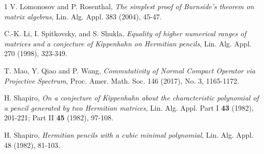 \documentclass[draft, 12pt, reqno]{amsart}
\numberwithin{equation}{section}
\theoremstyle{plain}
\begin{document}
\begin{thebibliography}{1}
 V. Lomonosov and P. Rosenthal, {\em The simplest proof of Burnside’s theorem on matrix algebras}, Lin. Alg. Appl. 383 (2004), 45-47.

 C.-K. Li, I. Spitkovsky, and S. Shukla, {\em Equality of higher numerical ranges of matrices and a conjecture of Kippenhahn on Hermitian pencils}, Lin. Alg. Appl. 270 (1998), 323-349.

 T. Mao, Y. Qiao and P. Wang, {\em Commutativity of Normal Compact Operator via Projective Spectrum}, Proc. Amer. Math. Soc. 146 (2017), No. 3, 1165-1172.








 H. Shapiro, {\em On a conjecture of Kippenhahn about the characteristic polynomial of a pencil generated by two Hermitian matrices}, Lin. Alg. Appl. Part I \textbf{43} (1982), 201-221; Part II \textbf{45} (1982), 97-108.

 H. Shapiro, {\em Hermitian pencils with a cubic minimal polynomial}, Lin. Alg. Appl. 48 (1982), 81-103.


\end{thebibliography}
\end{document}
